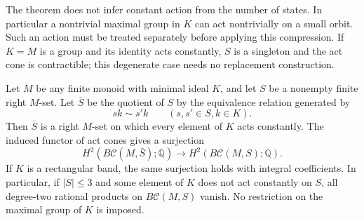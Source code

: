 \begin{remark}
\label{C:constant-minimal-act-scope}
The theorem does not infer constant action from the number of
states.  In particular a nontrivial maximal group in $K$ can act
nontrivially on a small orbit.  Such an action must be treated
separately before applying this compression.  If $K=M$ is a
group and its identity acts constantly, $S$ is a singleton and
the act cone is contractible; this degenerate case needs no
replacement construction.
\end{remark}

\begin{lemma}
\label{C:constant-action-quotient-H2}
Let $M$ be any finite monoid with minimal ideal $K$, and let $S$
be a nonempty finite right $M$-set.  Let $\bar S$ be the quotient
of $S$ by the equivalence relation generated by
\[
 sk\sim s'k\qquad(s,s'\in S, k\in K).
\]
Then $\bar S$ is a right $M$-set on which every element of $K$
acts constantly.  The induced functor of act cones gives a
surjection
\[
 H^2(B\mathcal C(M,\bar S);\mathbb Q)
 \longrightarrow H^2(B\mathcal C(M,S);\mathbb Q).
\]
If $K$ is a rectangular band, the same surjection holds with
integral coefficients.
In particular, if $|S|\leq3$ and some element of $K$ does not
act constantly on $S$, all degree-two rational products on
$B\mathcal C(M,S)$ vanish.  No restriction on the maximal group
of $K$ is imposed.
\end{lemma}
